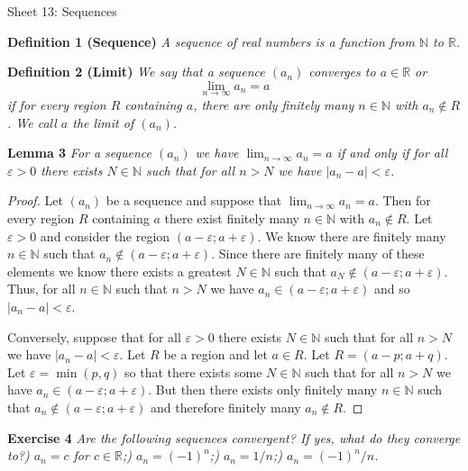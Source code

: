 \documentclass{article}
\begin{document}
\begin{flushleft}

\Large

Sheet 13: Sequences\newline

\normalsize

\textbf{Definition 1 (Sequence)}
\textsl{A sequence of real numbers is a function from $\mathbb{N}$ to $\mathbb{R}$.}\newline

\textbf{Definition 2 (Limit)}
\textsl{We say that a sequence $(a_n)$ converges to $a \in \mathbb{R}$ or
\[
\lim_{n \rightarrow \infty} a_n = a
\]
if for every region $R$ containing $a$, there are only finitely many $n \in \mathbb{N}$ with $a_n \notin R$. We call $a$ the limit of $(a_n)$.}\newline

\textbf{Lemma 3}
\textsl{For a sequence $(a_n)$ we have $\lim_{n \rightarrow \infty} a_n = a$ if and only if for all $\varepsilon > 0$ there exists $N \in \mathbb{N}$ such that for all $n > N$ we have $|a_n - a| < \varepsilon$.}
\begin{proof}
Let $(a_n)$ be a sequence and suppose that $\lim _{n \rightarrow \infty} a_n = a$. Then for every region $R$ containing $a$ there exist finitely many $n \in \mathbb{N}$ with $a_n \notin R$. Let $\varepsilon > 0$ and consider the region $(a - \varepsilon ; a + \varepsilon)$. We know there are finitely many $n \in \mathbb{N}$ such that $a_n \notin (a - \varepsilon ; a + \varepsilon)$. Since there are finitely many of these elements we know there exists a greatest $N \in \mathbb{N}$ such that $a_N \notin (a - \varepsilon ; a + \varepsilon)$. Thus, for all $n \in \mathbb{N}$ such that $n > N$ we have $a_n \in (a - \varepsilon ; a + \varepsilon)$ and so $|a_n - a| < \varepsilon$.\newline

Conversely, suppose that for all $\varepsilon > 0$ there exists $N \in \mathbb{N}$ such that for all $n > N$ we have $|a_n - a| < \varepsilon$. Let $R$ be a region and let $a \in R$. Let $R=(a-p;a+q)$. Let $\varepsilon = \min (p,q)$ so that there exists some $N \in \mathbb{N}$ such that for all $n > N$ we have $a_n \in (a - \varepsilon ; a + \varepsilon)$. But then there exists only finitely many $n \in \mathbb{N}$ such that $a_n \notin (a - \varepsilon ; a + \varepsilon)$ and therefore finitely many $a_n \notin R$.
\end{proof}

\textbf{Exercise 4}
\textsl{Are the following sequences convergent? If yes, what do they converge to?) $a_n=c$ for $c \in \mathbb{R}$;) $a_n=(-1)^n$;) $a_n=1/n$;) $a_n=(-1)^n/n$.}\newline


\end{flushleft}
\end{document}
